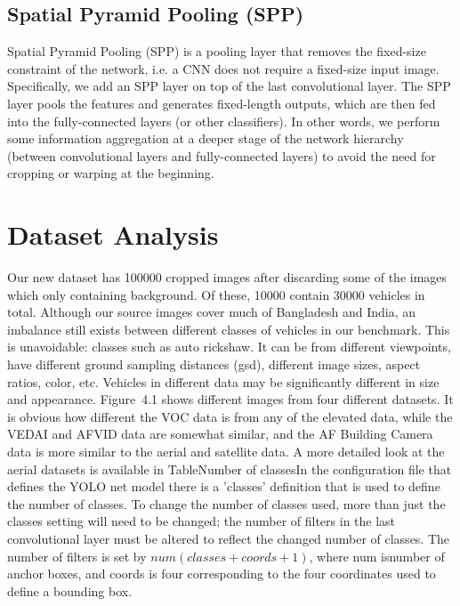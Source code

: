 \subsection{Spatial Pyramid Pooling (SPP)}
 Spatial Pyramid Pooling (SPP) is a pooling layer that removes the fixed-size constraint of the network, i.e. a CNN does not require a fixed-size input image. Specifically, we add an SPP layer on top of the last convolutional layer. The SPP layer pools the features and generates fixed-length outputs, which are then fed into the fully-connected layers (or other classifiers). In other words, we perform some information aggregation at a deeper stage of the network hierarchy (between convolutional layers and fully-connected layers) to avoid the need for cropping or warping at the beginning.
\newpage



\section{Dataset Analysis}
Our new dataset has 100000 cropped images after discarding some of the images which only containing background. Of these, 10000 contain 30000 vehicles in total. Although our source images cover much of Bangladesh and India, an imbalance still exists between different classes of vehicles in our benchmark. This is unavoidable: classes such as auto rickshaw. It can be from different viewpoints, have different ground sampling distances (gsd), different image sizes, aspect ratios, color, etc. Vehicles in different data may be significantly different in size and appearance. Figure~4.1 shows different images from four different datasets. It is obvious how different the VOC data is from any of the elevated data, while the VEDAI and AFVID data are somewhat similar, and the AF Building Camera data is more similar to the aerial and satellite data. A more detailed look at the aerial datasets is available in TableNumber of classesIn the configuration file that defines the YOLO net model there is a 'classes' definition that is used to define the number of classes. To change the number of classes used, more than just the classes setting will need to be changed; the number of filters in the last convolutional layer must be altered to reflect the changed number of classes. The number of filters is set by $num(classes + coords + 1)$, where num isnumber of anchor boxes, and coords is four corresponding to the four coordinates used to define a bounding box.

